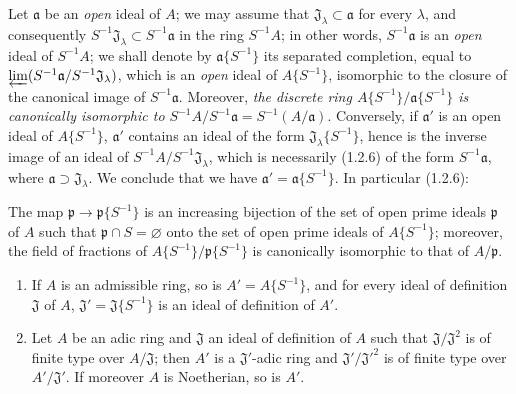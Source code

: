\begin{env}[7.6.9]
\label{0.7.6.9}
Let $\mathfrak a$ be an \emph{open} ideal of $A$; we may assume that
$\mathfrak J_\lambda\subset\mathfrak a$ for every $\lambda$, and consequently
$S^{-1}\mathfrak J_\lambda\subset S^{-1}\mathfrak a$ in the ring
$S^{-1}A$; in other words, $S^{-1}\mathfrak a$ is an \emph{open} ideal of
$S^{-1}A$; we shall denote by $\mathfrak a\{S^{-1}\}$ its separated completion,
equal to $\varprojlim(S^{-1}\mathfrak a/S^{-1}\mathfrak J_\lambda)$, which is an
\emph{open} ideal of $A\{S^{-1}\}$, isomorphic to the closure of the canonical
image of $S^{-1}\mathfrak a$. Moreover, \emph{the discrete ring
$A\{S^{-1}\}/\mathfrak a\{S^{-1}\}$ is canonically isomorphic to
$S^{-1}A/S^{-1}\mathfrak a=S^{-1}(A/\mathfrak a)$}. Conversely, if
$\mathfrak a'$ is an open ideal of $A\{S^{-1}\}$, $\mathfrak a'$ contains
an ideal of the form $\mathfrak J_\lambda\{S^{-1}\}$, hence is the inverse
image of an ideal of $S^{-1}A/S^{-1}\mathfrak J_\lambda$, which is
necessarily (1.2.6) of the form $S^{-1}\mathfrak a$, where
$\mathfrak a\supset\mathfrak J_\lambda$. We conclude that we have
$\mathfrak a'=\mathfrak a\{S^{-1}\}$. In particular (1.2.6):
\end{env}

\begin{proposition}[7.6.10]
\label{0.7.6.10}
The map $\mathfrak p\to\mathfrak p\{S^{-1}\}$ is an increasing
bijection of the set of \textup{open prime} ideals $\mathfrak p$ of $A$ such
that $\mathfrak p\cap S=\varnothing$ onto the set of \textup{open prime} ideals
of $A\{S^{-1}\}$; moreover, the field of fractions of
$A\{S^{-1}\}/\mathfrak p\{S^{-1}\}$ is canonically isomorphic to that of
$A/\mathfrak p$.
\end{proposition}

\begin{proposition}[7.6.11]
\label{0.7.6.11}
\begin{enumerate}
  \item[\rm(i)] If $A$ is an admissible ring, so is
    $A'=A\{S^{-1}\}$, and for every ideal of definition $\mathfrak J$ of $A$,
    $\mathfrak J'=\mathfrak J\{S^{-1}\}$ is an ideal of definition of $A'$.
  \item[\rm(ii)] Let $A$ be an adic ring and $\mathfrak J$ an ideal of
    definition of $A$ such that $\mathfrak J/\mathfrak J^2$ is of finite type
    over $A/\mathfrak J$; then $A'$ is a $\mathfrak J'$-adic ring and
    $\mathfrak J'/\mathfrak J'^2$ is of finite type over
    $A'/\mathfrak J'$. If moreover $A$ is Noetherian, so is
    $A'$.
\end{enumerate}
\end{proposition}

